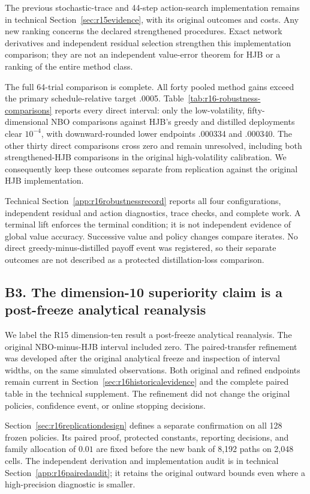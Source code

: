 The previous stochastic-trace and 44-step action-search implementation remains in technical Section~\ref{sec:r15evidence}, with its original outcomes and costs. Any new ranking concerns the declared strengthened procedures. Exact network derivatives and independent residual selection strengthen this implementation comparison; they are not an independent value-error theorem for HJB or a ranking of the entire method class.

The full 64-trial comparison is complete. All forty pooled method gains exceed the primary schedule-relative target .0005. Table~\ref{tab:r16-robustness-comparisons} reports every direct interval: only the low-volatility, fifty-dimensional NBO comparisons against HJB's greedy and distilled deployments clear $10^{-4}$, with downward-rounded lower endpoints .000334 and .000340. The other thirty direct comparisons cross zero and remain unresolved, including both strengthened-HJB comparisons in the original high-volatility calibration. We consequently keep these outcomes separate from replication against the original HJB implementation.

Technical Section~\ref{app:r16robustnessrecord} reports all four configurations, independent residual and action diagnostics, trace checks, and complete work. A terminal lift enforces the terminal condition; it is not independent evidence of global value accuracy. Successive value and policy changes compare iterates. No direct greedy-minus-distilled payoff event was registered, so their separate outcomes are not described as a protected distillation-loss comparison.

\subsection*{B3. The dimension-10 superiority claim is a post-freeze analytical reanalysis}\label{resp:B3}
We label the R15 dimension-ten result a post-freeze analytical reanalysis. The original NBO-minus-HJB interval included zero. The paired-transfer refinement was developed after the original analytical freeze and inspection of interval widths, on the same simulated observations. Both original and refined endpoints remain current in Section~\ref{sec:r16historicalevidence} and the complete paired table in the technical supplement. The refinement did not change the original policies, confidence event, or online stopping decisions.

Section~\ref{sec:r16replicationdesign} defines a separate confirmation on all 128 frozen policies. Its paired proof, protected constants, reporting decisions, and family allocation of $0.01$ are fixed before the new bank of 8,192 paths on 2,048 cells. The independent derivation and implementation audit is in technical Section~\ref{app:r16pairedaudit}; it retains the original outward bounds even where a high-precision diagnostic is smaller.

